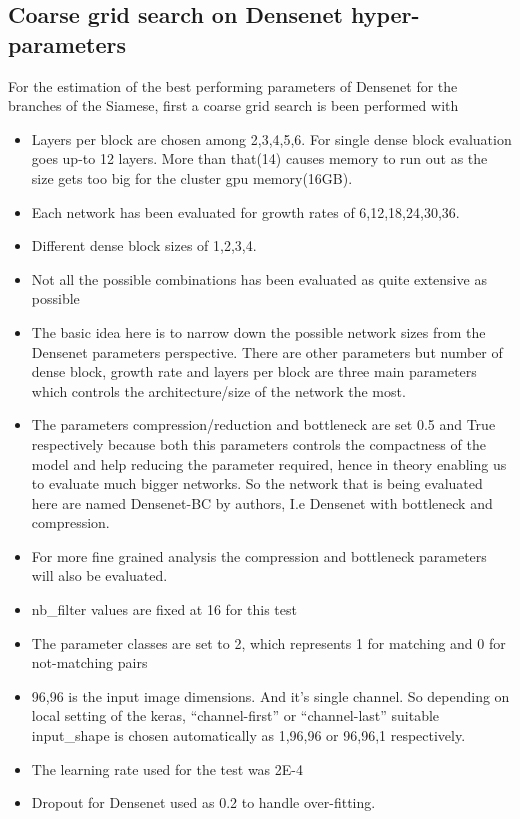 \subsection{Coarse grid search on Densenet hyper-parameters}
For the estimation of the best performing parameters of Densenet for the branches of the Siamese, first a coarse grid search is been performed with 
\begin{itemize}
 \item Layers per block are chosen among 2,3,4,5,6. For single dense block evaluation goes up-to 12 layers. More than that(14) causes memory to run out as the size gets too big 
 for the cluster gpu memory(16GB). 
 \item Each network has been evaluated for growth rates of 6,12,18,24,30,36. 
 \item Different dense block sizes of 1,2,3,4.  
 \item Not all the possible combinations has been evaluated as quite extensive as possible
 \item The basic idea here is to narrow down the possible network sizes from the Densenet parameters perspective. There are other parameters but number of dense block, 
 growth rate and layers per block are three main parameters which controls the architecture/size of the network the most.
 \item The parameters compression/reduction and bottleneck are set 0.5 and True respectively because both this parameters controls the compactness of the model and help 
 reducing the parameter required, hence in theory enabling us to evaluate much bigger networks. So the network that is being evaluated here are named Densenet-BC by authors, 
 I.e Densenet with bottleneck and compression.
 \item For more fine grained analysis the compression and bottleneck parameters will also be evaluated. 
 \item nb\_filter values are fixed at 16 for this test
 \item The parameter classes are set to 2, which represents 1 for matching and 0 for not-matching pairs
 \item 96,96 is the input image dimensions. And it’s single channel. So depending on local setting of the keras, “channel-first” or “channel-last” suitable input\_shape is 
 chosen automatically as  1,96,96  or 96,96,1 respectively.
 \item The learning rate used for the test was 2E-4
 \item Dropout for Densenet used as 0.2 to handle over-fitting.  

\end{itemize}
